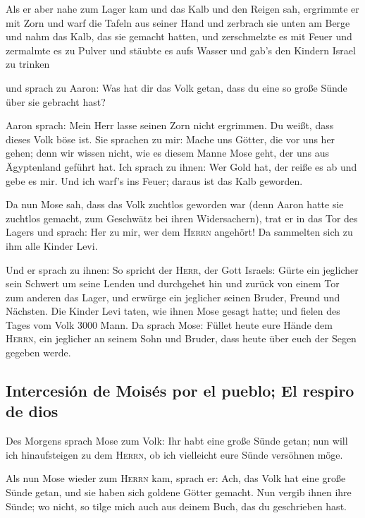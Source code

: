  Als er aber nahe zum Lager kam und das Kalb und den
Reigen sah, ergrimmte er mit Zorn und warf die Tafeln aus seiner Hand
und zerbrach sie unten am Berge  und nahm das Kalb, das
sie gemacht hatten, und zerschmelzte es mit Feuer und zermalmte es zu
Pulver und stäubte es aufs Wasser und gab's den Kindern Israel zu
trinken

 und sprach zu Aaron: Was hat dir das Volk getan, dass du
eine so große Sünde über sie gebracht hast?

 Aaron sprach: Mein Herr lasse seinen Zorn nicht
ergrimmen. Du weißt, dass dieses Volk böse ist.  Sie
sprachen zu mir: Mache uns Götter, die vor uns her gehen; denn wir
wissen nicht, wie es diesem Manne Mose geht, der uns aus Ägyptenland
geführt hat.  Ich sprach zu ihnen: Wer Gold hat, der
reiße es ab und gebe es mir. Und ich warf's ins Feuer; daraus ist das
Kalb geworden.

 Da nun Mose sah, dass das Volk zuchtlos geworden war
(denn Aaron hatte sie zuchtlos gemacht, zum Geschwätz bei ihren
Widersachern),  trat er in das Tor des Lagers und sprach:
Her zu mir, wer dem \textsc{Herrn} angehört! Da sammelten sich zu ihm
alle Kinder Levi.

 Und er sprach zu ihnen: So spricht der \textsc{Herr},
der Gott Israels: Gürte ein jeglicher sein Schwert um seine Lenden und
durchgehet hin und zurück von einem Tor zum anderen das Lager, und
erwürge ein jeglicher seinen Bruder, Freund und Nächsten.
 Die Kinder Levi taten, wie ihnen Mose gesagt hatte; und
fielen des Tages vom Volk 3000 Mann.  Da sprach Mose:
Füllet heute eure Hände dem \textsc{Herrn}, ein jeglicher an seinem Sohn
und Bruder, dass heute über euch der Segen gegeben werde.

\hypertarget{intercesiuxf3n-de-moisuxe9s-por-el-pueblo-el-respiro-de-dios}{%
\subsection{Intercesión de Moisés por el pueblo; El respiro de
dios}\label{intercesiuxf3n-de-moisuxe9s-por-el-pueblo-el-respiro-de-dios}}

 Des Morgens sprach Mose zum Volk: Ihr habt eine große
Sünde getan; nun will ich hinaufsteigen zu dem \textsc{Herrn}, ob ich
vielleicht eure Sünde versöhnen möge.

 Als nun Mose wieder zum \textsc{Herrn} kam, sprach er:
Ach, das Volk hat eine große Sünde getan, und sie haben sich goldene
Götter gemacht.  Nun vergib ihnen ihre Sünde; wo nicht,
so tilge mich auch aus deinem Buch, das du geschrieben hast.

